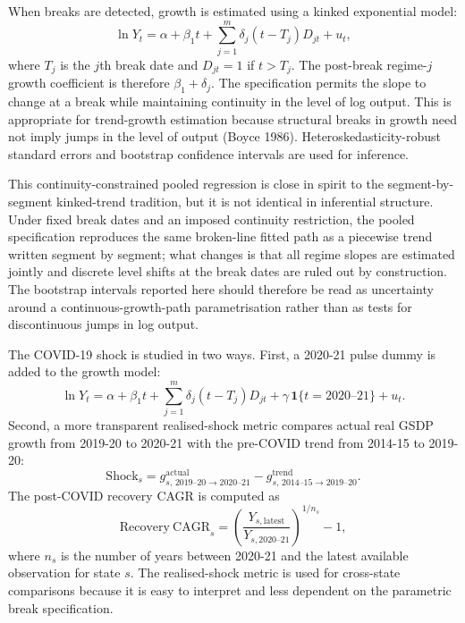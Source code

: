 \documentclass[11pt,a4paper]{article}
\begin{document}
When breaks are detected, growth is estimated using a kinked exponential model:
\begin{equation}
\ln Y_t = \alpha + \beta_1 t + \sum_{j=1}^{m}\delta_j(t-T_j)D_{jt} + u_t,
\end{equation}
where $T_j$ is the $j$th break date and $D_{jt}=1$ if $t>T_j$. The post-break regime-$j$ growth coefficient is therefore $\beta_1+\delta_j$. The specification permits the slope to change at a break while maintaining continuity in the level of log output. This is appropriate for trend-growth estimation because structural breaks in growth need not imply jumps in the level of output (Boyce 1986). Heteroskedasticity-robust standard errors and bootstrap confidence intervals are used for inference.

This continuity-constrained pooled regression is close in spirit to the segment-by-segment kinked-trend tradition, but it is not identical in inferential structure. Under fixed break dates and an imposed continuity restriction, the pooled specification reproduces the same broken-line fitted path as a piecewise trend written segment by segment; what changes is that all regime slopes are estimated jointly and discrete level shifts at the break dates are ruled out by construction. The bootstrap intervals reported here should therefore be read as uncertainty around a continuous-growth-path parametrisation rather than as tests for discontinuous jumps in log output.

The COVID-19 shock is studied in two ways. First, a 2020-21 pulse dummy is added to the growth model:
\begin{equation}
\ln Y_t = \alpha + \beta_1 t + \sum_{j=1}^{m}\delta_j(t-T_j)D_{jt} + \gamma \,\mathbf{1}\{t=2020\text{--}21\} + u_t.
\end{equation}
Second, a more transparent realised-shock metric compares actual real GSDP growth from 2019-20 to 2020-21 with the pre-COVID trend from 2014-15 to 2019-20:
\begin{equation}
\mathrm{Shock}_s = g^{\mathrm{actual}}_{s,\,2019\text{--}20 \rightarrow 2020\text{--}21} - g^{\mathrm{trend}}_{s,\,2014\text{--}15 \rightarrow 2019\text{--}20}.
\end{equation}
The post-COVID recovery CAGR is computed as
\begin{equation}
\mathrm{Recovery\ CAGR}_s = \left(\frac{Y_{s,\mathrm{latest}}}{Y_{s,2020\text{--}21}}\right)^{1/n_s}-1,
\end{equation}
where $n_s$ is the number of years between 2020-21 and the latest available observation for state $s$. The realised-shock metric is used for cross-state comparisons because it is easy to interpret and less dependent on the parametric break specification.
\end{document}
